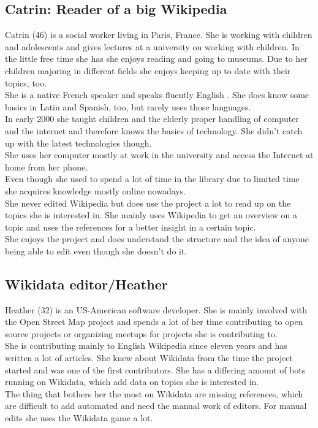 \subsection{Catrin: Reader of a big Wikipedia}
Catrin (46) is a social worker living in Paris, France. She is working with children and adolescents and gives lectures at a university on working with children. In the little free time she has she enjoys reading and going to museums. Due to her children majoring in different fields she enjoys keeping up to date with their topics, too. \\
She is a native French speaker and speaks fluently English . She does know some basics in Latin and Spanish, too, but rarely uses those languages. \\
In early 2000 she taught children and the elderly proper handling of computer and the internet and therefore knows the basics of technology. She didn't catch up with the latest technologies though. \\
She uses her computer mostly at work in the university and access the Internet at home from her phone. \\
Even though she used to spend a lot of time in the library due to limited time she acquires knowledge mostly online nowadays. \\
She never edited Wikipedia but does use the project a lot to read up on the topics she is interested in. She mainly uses Wikipedia to get an overview on a topic and uses the references for a better insight in a certain topic. \\
She enjoys the project and does understand the structure and the idea of anyone being able to edit even though she doesn't do it. \\


\subsection{Wikidata editor/Heather}
Heather (32) is an US-American software developer. She is mainly involved with the Open Street Map project and spends a lot of her time contributing to open source projects or organizing meetups for projects she is contributing to. \\
She is contributing mainly to English Wikipedia since eleven years and has written a lot of articles. 
She knew about Wikidata from the time the project started and was one of the first contributors. She has a differing amount of bots running on Wikidata, which add data on topics she is interested in. \\
The thing that bothers her the most on Wikidata are missing references, which are difficult to add automated and need the manual work of editors. For manual edits she uses the Wikidata game a lot. 

